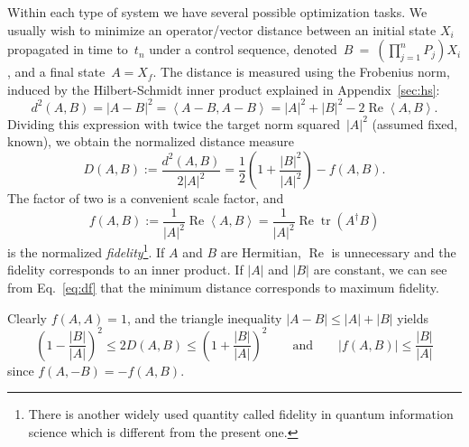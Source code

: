 \documentclass[aps, pra, a4paper, longbibliography, superscriptaddress]{revtex4-1}
\newcommand{\be}{\begin{equation}}
\newcommand{\ee}{\end{equation}}
\newcommand{\inprod}[2]{\left\langle #1, #2 \right\rangle}
\DeclareMathOperator{\tr}{tr}
\DeclareMathOperator{\re}{Re}
\begin{document}
Within each type of system we have several possible optimization tasks.
We usually wish to minimize an operator/vector distance between an
initial state $X_i$ propagated in time to~$t_n$ under a control sequence,
denoted~$B~=~\left(\prod_{j=1}^{n} P_j\right) X_i$,
and a final state~$A = X_f$.
The distance is measured using the Frobenius norm, induced by the Hilbert-Schmidt inner product explained in Appendix~\ref{sec:hs}:
\be
d^2(A, B) = |A-B|^2
= \inprod{A-B}{A-B}
= |A|^2 +|B|^2 -2 \re \inprod{A}{B}.
\ee
Dividing this expression with twice the target norm squared~$|A|^2$ (assumed fixed,
known), we obtain the normalized distance measure
\be
\label{eq:df}
D(A,B)
:= \frac{d^2(A, B)}{2|A|^2}
= \frac{1}{2}\left(1 +\frac{|B|^2}{|A|^2}\right) -f(A, B).
\ee
The factor of two is a convenient scale factor, and
\be
f(A, B)
:= \frac{1}{|A|^2} \re \inprod{A}{B}
= \frac{1}{|A|^2} \re \tr(A^\dagger B)
\ee
is the normalized \emph{fidelity}\footnote{
There is another widely used quantity called fidelity in quantum information science which is different from the present one.}.
If $A$ and $B$ are Hermitian, $\re$ is unnecessary and the fidelity corresponds to an inner product.
If $|A|$ and $|B|$ are constant, we can see from Eq.~\eqref{eq:df} that
the minimum distance corresponds to maximum fidelity.

Clearly $f(A, A) = 1$, and
the triangle inequality $|A-B| \le |A|+|B|$ yields
\be
\left(1 -\frac{|B|}{|A|} \right)^2 \le 2D(A, B) \le \left(1 +\frac{|B|}{|A|} \right)^2
\qquad \text{and} \qquad
|f(A, B)|
\le \frac{|B|}{|A|}
\ee
since $f(A, -B) = -f(A, B)$.
\end{document}
